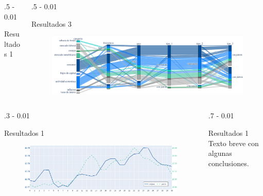 \documentclass{iteraposter}\usepackage[]{graphicx}\usepackage[]{color}
\begin{document}
\begin{frame}
\begin{columns}[onlytextwidth]
\begin{column}{.5 \textwidth - 0.01 \textwidth}
\begin{block}{Resultados 1}
      \normalsize
    \end{block}
  \end{column}
      
  \begin{column}{.5 \textwidth - 0.01 \textwidth}
    \begin{block}{Resultados 3}
      \begin{figure}[H]
        \includegraphics[scale=1]{imagenes/grafica_3.png}
      \end{figure}
    \end{block}
  \end{column}
  
\end{columns}


\begin{columns}[onlytextwidth]
  
  \begin{column}{.3 \textwidth - 0.01 \textwidth}
    \begin{block}{Resultados 1}
      \begin{figure}[H]
        \includegraphics[scale=.5]{imagenes/grafica_2.png}
      \end{figure}
    \end{block}
  \end{column}
  
  \begin{column}{.7 \textwidth - 0.01 \textwidth}
    \begin{block}{Resultados 1}
      Texto breve con algunas conclusiones.
      \end{block}
  \end{column}
\end{columns}

\end{frame}
\end{document}
